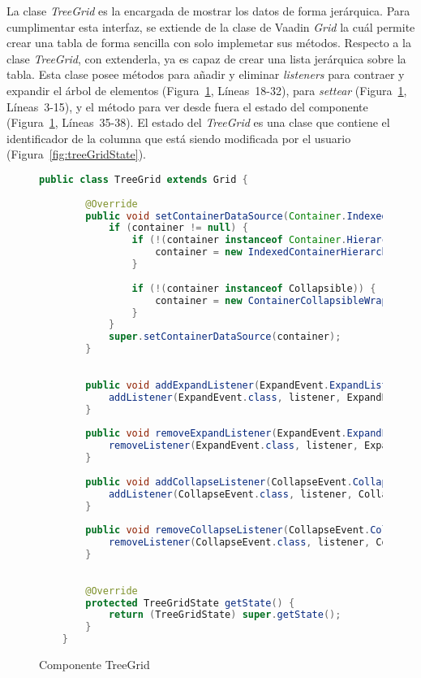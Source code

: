 La clase \emph{TreeGrid} es la encargada de mostrar los datos de forma jerárquica. Para cumplimentar esta interfaz, se extiende de la clase de Vaadin \emph{Grid} la cuál permite crear una tabla de forma sencilla con solo implemetar sus métodos. Respecto a la clase \emph{TreeGrid}, con extenderla, ya es capaz de crear una lista jerárquica sobre la tabla. Esta clase posee métodos para añadir y eliminar \emph{listeners} para contraer y expandir el árbol de elementos (Figura~\ref{fig:treeGrid}, Líneas~18-32), para \emph{settear} (Figura~\ref{fig:treeGrid}, Líneas~3-15), y el método para ver desde fuera el estado del componente (Figura~\ref{fig:treeGrid}, Líneas~35-38). El estado del \emph{TreeGrid} es una clase que contiene el identificador de la columna que está siendo modificada por el usuario (Figura~\ref{fig:treeGridState}).


\begin{figure}[!tb]
	\centering
	\begin{lstlisting}[language=Java]
	public class TreeGrid extends Grid {
		
		@Override
		public void setContainerDataSource(Container.Indexed container) {
			if (container != null) {
				if (!(container instanceof Container.Hierarchical)) {
					container = new IndexedContainerHierarchicalWrapper(container);
				}
				
				if (!(container instanceof Collapsible)) {
					container = new ContainerCollapsibleWrapper(container);
				}
			}
			super.setContainerDataSource(container);
		}
		
		
		public void addExpandListener(ExpandEvent.ExpandListener listener) {
			addListener(ExpandEvent.class, listener, ExpandEvent.ExpandListener.EXPAND_METHOD);
		}
		
		public void removeExpandListener(ExpandEvent.ExpandListener listener) {
			removeListener(ExpandEvent.class, listener, ExpandEvent.ExpandListener.EXPAND_METHOD);
		}
		
		public void addCollapseListener(CollapseEvent.CollapseListener listener) {
			addListener(CollapseEvent.class, listener, CollapseEvent.CollapseListener.COLLAPSE_METHOD);
		}
		
		public void removeCollapseListener(CollapseEvent.CollapseListener listener) {
			removeListener(CollapseEvent.class, listener, CollapseEvent.CollapseListener.COLLAPSE_METHOD);
		}
		
		
		@Override
		protected TreeGridState getState() {
			return (TreeGridState) super.getState();
		}
	}
	\end{lstlisting}
	\caption{Componente TreeGrid}
	\label{fig:treeGrid}
\end{figure}

